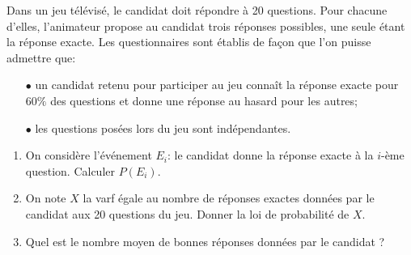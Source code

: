 \documentclass[a4paper, 11pt,reqno]{article}
\begin{document}
\begin{exercice}  \;
	Dans un jeu t\'el\'evis\'e, le candidat doit r\'epondre \`a 20 questions. Pour chacune d'elles, l'animateur propose au candidat trois r\'eponses possibles, une seule \'etant la r\'eponse exacte. Les questionnaires sont \'etablis de fa\c{c}on que l'on puisse admettre que:
	\begin{itemize}
		\item[$\bullet$] un candidat retenu pour participer au jeu conna\^it la r\'eponse exacte pour $60\%$ des questions et donne une r\'eponse au hasard pour les autres;
		\item[$\bullet$]  les questions pos\'ees lors du jeu sont ind\'ependantes.
	\end{itemize}
	\begin{enumerate}
		\item On consid\`ere l'\'ev\'enement $E_i$: le candidat donne la r\'eponse exacte \`a la $i$-\`eme question. Calculer $P(E_i)$.
		\item On note $X$ la varf \'egale au nombre de r\'eponses exactes donn\'ees par le candidat aux 20 questions du jeu. Donner la loi de probabilit\'e de $X$.
		\item Quel est le nombre moyen de bonnes r\'eponses donn\'ees par le candidat ?
	\end{enumerate}
\end{exercice}
\end{document}
